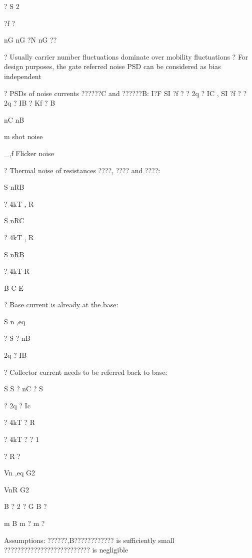 \documentclass[2pt,landscape]{article}
\begin{document}
\begin{multicols*}{5}
?	S	2


?f ?


nG	nG	?N	nG	??

?	Usually carrier number fluctuations dominate over mobility fluctuations
?	For design purposes, the gate referred noise PSD can be considered 
as bias independent





?	PSD\textbullet s of noise currents ??????C  and ??????B:
I?F
SI	?f ? ? 2q ? IC ,	SI	?f ? ? 2q ? IB ? Kf ? B  



nC	nB


m
shot noise


\_,f
Flicker noise


?	Thermal noise of resistances ????, ???? and ????:



S
nRB


? 4kT ,
R


S
nRC


? 4kT ,
R


S
nRB


? 4kT
R


B	C	E







?	Base current is already at the base:




S
n ,eq


? S	?
nB


2q ? IB




?	Collector current needs to be referred back to base:




S
S	?	nC  ? S




? 2q ? Ic


?	4kT ? R


? 4kT ? ?	1


? R ?


Vn ,eq	G2


VnR	G2


B	? 2 ? G	B ?


m	B	m	?	m	?





Assumptions:
\textbullet 	??????,B????????????  is sufficiently 
small
\textbullet 	??????????????????????????  is negligible




\end{multicols*}
\end{document}

